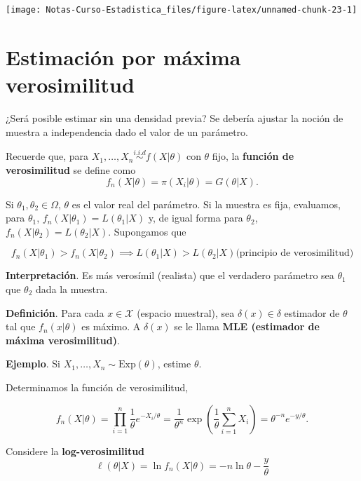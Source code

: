 \documentclass[
  12pt,
]{book}
\begin{document}
\begin{center}\texttt{[image: Notas-Curso-Estadistica\_files/figure-latex/unnamed-chunk-23-1]} \end{center}

\hypertarget{estimaciuxf3n-por-muxe1xima-verosimilitud}{%
\chapter{Estimación por máxima verosimilitud}\label{estimaciuxf3n-por-muxe1xima-verosimilitud}}

¿Será posible estimar sin una densidad previa? Se debería ajustar la noción de
muestra a independencia dado el valor de un parámetro.

Recuerde que, para \(X_1,\dots, X_n \stackrel{i.i.d}{\sim} f(X|\theta)\) con \(\theta\)
fijo, la \textbf{función de verosimilitud} se define como \[ f_n(X|\theta) =
\pi(X_i|\theta) = G(\theta|X).\]

Si \(\theta_1,\theta_2\in \Omega\), \(\theta\) es el valor real del parámetro. Si la muestra es
fija, evaluamos, para \(\theta_1\), \(f_n(X|\theta_1) = L(\theta_1|X)\) y, de igual forma para
\(\theta_2\), \(f_n(X|\theta_2) = L(\theta_2|X)\). Supongamos que

\begin{equation*}
f_n(X|\theta_1) >f_n(X|\theta_2) \implies L(\theta_1|X)>L(\theta_2|X) \text{
(principio de verosimilitud)} 
\end{equation*}

\textbf{Interpretación}. Es más verosímil (realista) que el verdadero parámetro sea
\(\theta_1\) que \(\theta_2\) dada la muestra.

\textbf{Definición}. Para cada \(x\in \mathcal{X}\) (espacio muestral), sea
\(\delta(x) \in \delta\) estimador de \(\theta\) tal que \(f_n(x|\theta)\) es máximo. A
\(\delta(x)\) se le llama \textbf{MLE (estimador de máxima verosimilitud)}.

\textbf{Ejemplo}. Si \(X_1,\dots, X_n \sim \text{Exp}(\theta)\), estime \(\theta\).

Determinamos la función de verosimilitud,

\begin{equation*} 
f_n(X|\theta) =
\prod_{i=1}^n \dfrac{1}\theta e^{-X_i/\theta} = \dfrac1{\theta^n}
\exp\left(\dfrac{1}\theta \sum_{i=1}^nX_i\right) = \theta^{-n}e^{-y/\theta}.
\end{equation*}

Considere la \textbf{log-verosimilitud}
\begin{equation*}
\ell(\theta|X) = \ln f_n(X|\theta) = -n\ln \theta - \dfrac{y}{\theta}
\end{equation*}
\end{document}
